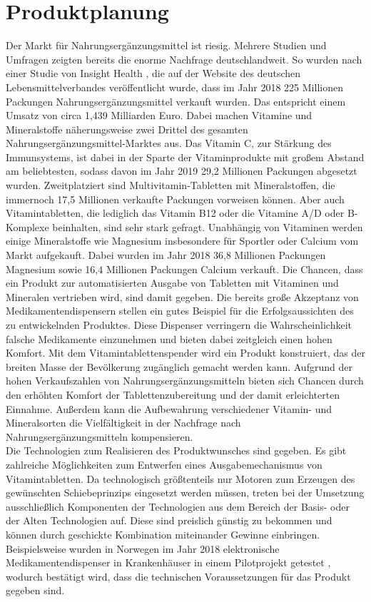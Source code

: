 \section{Produktplanung}
Der Markt für Nahrungsergänzungsmittel ist riesig. Mehrere Studien und Umfragen zeigten bereits die enorme Nachfrage deutschlandweit. So wurden nach einer Studie von Insight Health \cite{studie1}, die auf der Website des deutschen Lebensmittelverbandes veröffentlicht wurde, dass im Jahr 2018 225 Millionen Packungen Nahrungsergänzungsmittel verkauft wurden. Das entspricht einem Umsatz von circa 1,439 Milliarden Euro. Dabei machen Vitamine und Mineralstoffe näherungsweise zwei Drittel des gesamten Nahrungsergänzungsmittel-Marktes aus. Das Vitamin C, zur Stärkung des Immunsystems, ist dabei in der Sparte der Vitaminprodukte mit großem Abstand am beliebtesten, sodass davon im Jahr 2019 29,2 Millionen Packungen abgesetzt wurden. Zweitplatziert sind Multivitamin-Tabletten mit Mineralstoffen, die immernoch 17,5 Millionen verkaufte Packungen vorweisen können. Aber auch Vitamintabletten, die lediglich das Vitamin B12 oder die Vitamine A/D oder B-Komplexe beinhalten, sind sehr stark gefragt. Unabhängig von Vitaminen werden einige Mineralstoffe wie Magnesium insbesondere für Sportler oder Calcium vom Markt aufgekauft. Dabei wurden im Jahr 2018 36,8 Millionen Packungen Magnesium sowie 16,4 Millionen Packungen Calcium verkauft. Die Chancen, dass ein Produkt zur automatisierten Ausgabe von Tabletten mit Vitaminen und Mineralen vertrieben wird, sind damit gegeben. Die bereits große Akzeptanz von Medikamentendispensern stellen ein gutes Beispiel für die Erfolgsaussichten des zu entwickelnden Produktes. Diese Dispenser verringern die Wahrscheinlichkeit falsche Medikamente einzunehmen und bieten dabei zeitgleich einen hohen Komfort. Mit dem Vitamintablettenspender wird ein Produkt konstruiert, das der breiten Masse der Bevölkerung zugänglich gemacht werden kann. Aufgrund der hohen Verkaufszahlen von Nahrungsergänzungsmitteln bieten sich Chancen durch den erhöhten Komfort der Tablettenzubereitung und der damit erleichterten Einnahme. Außerdem kann die Aufbewahrung verschiedener Vitamin- und Mineralsorten die Vielfältigkeit in der Nachfrage nach Nahrungsergänzungsmitteln kompensieren.\\
Die Technologien zum Realisieren des Produktwunsches sind gegeben. Es gibt zahlreiche Möglichkeiten zum Entwerfen eines Ausgabemechanismus von Vitamintabletten. Da technologisch größtenteils nur Motoren zum Erzeugen des gewünschten Schiebeprinzips eingesetzt werden müssen, treten bei der Umsetzung ausschließlich Komponenten der Technologien aus dem Bereich der Basis- oder der Alten Technologien auf. Diese sind preislich günstig zu bekommen und können durch geschickte Kombination miteinander Gewinne einbringen. Beispielsweise wurden in Norwegen im Jahr 2018 elektronische Medikamentendispenser in Krankenhäuser in einem Pilotprojekt getestet \cite{studie2}, wodurch bestätigt wird, dass die technischen Voraussetzungen für das Produkt gegeben sind.\\
